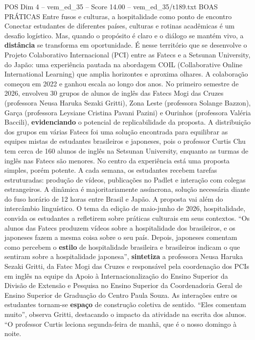 \begin{textsample}{POS Dim 4 – vem\_ed\_35 – Score 14.00 – vem\_ed\_35/t189.txt}  \label{ex:f4_pos_002}
BOAS PRÁTICAS Entre fusos e culturas, a hospitalidade como ponto de encontro Conectar estudantes de diferentes países, culturas e rotinas acadêmicas é um desafio logístico.
Mas, quando o propósito é claro e o diálogo se mantém vivo, a \textbf{distância} se transforma em oportunidade.
É nesse território que se desenvolve o Projeto Colaborativo Internacional (PCI) entre as Fatecs e a Setsunan University, do Japão: uma experiência pautada na abordagem COIL (Collaborative Online International Learning) que amplia horizontes e aproxima olhares.
A colaboração começou em 2022 e ganhou escala ao longo dos anos.
No primeiro semestre de 2026, envolveu 30 grupos de alunos de inglês das Fatecs Mogi das Cruzes (professora Neusa Haruka Sezaki Gritti), Zona Leste (professora Solange Bazzon), Garça (professora Leysiane Cristina Pavani Pazini) e Ourinhos (professora Valéria Baccili), \textbf{evidenciando} o potencial de replicabilidade da proposta.
A distribuição dos grupos em várias Fatecs foi uma solução encontrada para equilibrar as equipes mistas de estudantes brasileiros e japoneses, pois o professor Curtis Chu tem cerca de 160 alunos de inglês na Setsunan University, enquanto as turmas de inglês nas Fatecs são menores.
No centro da experiência está uma proposta simples, porém potente.
A cada semana, os estudantes recebem tarefas estruturadas: produção de vídeos, publicações no Padlet e interação com colegas estrangeiros.
A dinâmica é majoritariamente assíncrona, solução necessária diante do fuso horário de 12 horas entre Brasil e Japão.
A proposta vai além do intercâmbio linguístico.
O tema da edição de maio-junho de 2026, hospitalidade, convida os estudantes a refletirem sobre práticas culturais em seus contextos. “Os alunos das Fatecs produzem vídeos sobre a hospitalidade dos brasileiros, e os japoneses fazem a mesma coisa sobre o seu país.
Depois, japoneses comentam como percebem o \textbf{estilo} de hospitalidade brasileira e brasileiros indicam o que sentiram sobre a hospitalidade japonesa”, \textbf{sintetiza} a professora Neusa Haruka Sezaki Gritti, da Fatec Mogi das Cruzes e responsável pela coordenação dos PCIs em inglês na equipe da Apoio à Internacionalização do Ensino Superior da Divisão de Extensão e Pesquisa no Ensino Superior da Coordenadoria Geral de Ensino Superior de Graduação do Centro Paula Souza.
As interações entre os estudantes tornam-se \textbf{espaço} de construção coletiva de sentido. “Eles comentam muito”, observa Gritti, destacando o impacto da atividade na escrita dos alunos. “O professor Curtis leciona segunda-feira de manhã, que é o nosso domingo à noite.

\end{textsample}
